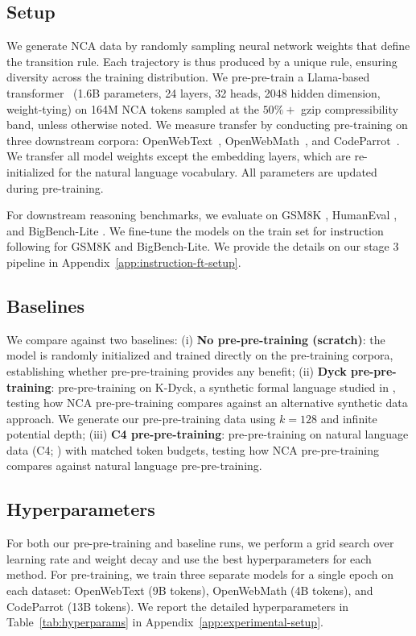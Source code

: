 \documentclass{article}
\theoremstyle{plain}
\theoremstyle{definition}
\theoremstyle{remark}
\begin{document}
\subsection{Setup}
We generate NCA data by randomly sampling neural network weights that define the transition rule. Each trajectory is thus produced by a unique rule, ensuring diversity across the training distribution. We pre-pre-train a Llama-based transformer~\citep{touvron2023llamaopenefficientfoundation} (1.6B parameters, 24 layers, 32 heads, 2048 hidden dimension, weight-tying) on 164M NCA tokens sampled at the $50\%+$ gzip compressibility band, unless otherwise noted. We measure transfer by conducting pre-training on three downstream corpora: OpenWebText~\citep{Gokaslan2019OpenWeb}, OpenWebMath~\citep{paster2023openwebmath}, and CodeParrot~\citep{tunstall2022natural}. We transfer all model weights except the embedding layers, which are re-initialized for the natural language vocabulary. All parameters are updated during pre-training.

For downstream reasoning benchmarks, we evaluate on GSM8K \citep{cobbe2021training}, HumanEval \citep{chen2021evaluating}, and BigBench-Lite \citep{srivastava2023beyond}. We fine-tune the models on the train set for instruction following for GSM8K and BigBench-Lite. We provide the details on our stage 3 pipeline in Appendix~\ref{app:instruction-ft-setup}.

\subsection{Baselines}
We compare against two baselines: (i) \textbf{No pre-pre-training (scratch)}: the model is randomly initialized and trained directly on the pre-training corpora, establishing whether pre-pre-training provides any benefit; (ii) \textbf{Dyck pre-pre-training}: pre-pre-training on K-Dyck, a synthetic formal language studied in \citet{hu2025circuitschomskyprepretrainingformal}, testing how NCA pre-pre-training compares against an alternative synthetic data approach. We generate our pre-pre-training data using $k=128$ and infinite potential depth; (iii) \textbf{C4 pre-pre-training}: pre-pre-training on natural language data (C4; \citet{c4}) with matched token budgets, testing how NCA pre-pre-training compares against natural language pre-pre-training.

\subsection{Hyperparameters}
For both our pre-pre-training and baseline runs, we perform a grid search over learning rate and weight decay and use the best hyperparameters for each method. For pre-training, we train three separate models for a single epoch on each dataset: OpenWebText (9B tokens), OpenWebMath (4B tokens), and CodeParrot (13B tokens). We report the detailed hyperparameters in Table~\ref{tab:hyperparams} in Appendix~\ref{app:experimental-setup}.
\end{document}
